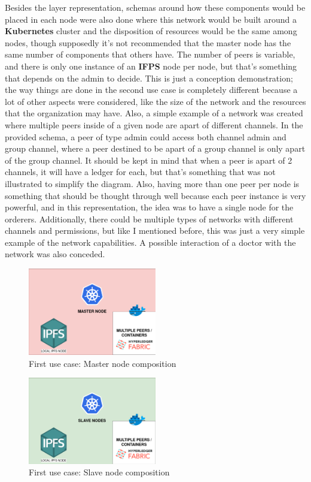 Besides the layer representation, schemas around how these components would be placed in each node were also done where this network would be built around a \textbf{Kubernetes} cluster and the disposition of resources would be the same among nodes, though supposedly it's not recommended that the master node has the same number of components that others have. The number of peers is variable, and there is only one instance of an \textbf{IFPS} node per node, but that's something that depends on the admin to decide. This is just a conception demonstration; the way things are done in the second use case is completely different because a lot of other aspects were considered, like the size of the network and the resources that the organization may have. Also, a simple example of a network was created where multiple peers inside of a given node are apart of different channels. In the provided schema, a peer of type admin could access both channel admin and group channel, where a peer destined to be apart of a group channel is only apart of the group channel. It should be kept in mind that when a peer is apart of 2 channels, it will have a ledger for each, but that's something that was not illustrated to simplify the diagram. Also, having more than one peer per node is something that should be thought through well because each peer instance is very powerful, and in this representation, the idea was to have a single node for the orderers. Additionally, there could be multiple types of networks with different channels and permissions, but like I mentioned before, this was just a very simple example of the network capabilities. A possible interaction of a doctor with the network was also conceded.

\begin{figure}[H]
    \centering
    \includegraphics[width=0.5\textwidth]{assets/use-case-1/Master.png} %
    \caption{First use case: Master node composition}
    \label{fig:sample-image} 
\end{figure}

\begin{figure}[H]
    \centering
    \includegraphics[width=0.5\textwidth]{assets/use-case-1/Slave.png} %
    \caption{First use case: Slave node composition}
    \label{fig:sample-image} 
\end{figure}

